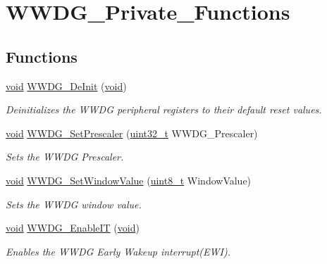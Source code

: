 \hypertarget{group___w_w_d_g___private___functions}{}\section{W\+W\+D\+G\+\_\+\+Private\+\_\+\+Functions}
\label{group___w_w_d_g___private___functions}
\subsection*{Functions}
\begin{DoxyCompactItemize}
\item 
\hyperlink{usb__devapi_8h_afabf60e7f57651d6d595a02c75f07cd0}{void} \hyperlink{group___w_w_d_g___private___functions_ga7130f4dc861b9234b62e73f9f57f89a1}{W\+W\+D\+G\+\_\+\+De\+Init} (\hyperlink{usb__devapi_8h_afabf60e7f57651d6d595a02c75f07cd0}{void})
\begin{DoxyCompactList}\small\item\em Deinitializes the W\+W\+DG peripheral registers to their default reset values. \end{DoxyCompactList}\item 
\hyperlink{usb__devapi_8h_afabf60e7f57651d6d595a02c75f07cd0}{void} \hyperlink{group___w_w_d_g___private___functions_gafeaa2b52c31ba7baca7eb61d2d42e07b}{W\+W\+D\+G\+\_\+\+Set\+Prescaler} (\hyperlink{_p_e___types_8h_a33594304e786b158f3fb30289278f5af}{uint32\+\_\+t} W\+W\+D\+G\+\_\+\+Prescaler)
\begin{DoxyCompactList}\small\item\em Sets the W\+W\+DG Prescaler. \end{DoxyCompactList}\item 
\hyperlink{usb__devapi_8h_afabf60e7f57651d6d595a02c75f07cd0}{void} \hyperlink{group___w_w_d_g___private___functions_gaf44a7bf8bf6b11b41cd89ff521fdd5a5}{W\+W\+D\+G\+\_\+\+Set\+Window\+Value} (\hyperlink{_p_e___types_8h_aba7bc1797add20fe3efdf37ced1182c5}{uint8\+\_\+t} Window\+Value)
\begin{DoxyCompactList}\small\item\em Sets the W\+W\+DG window value. \end{DoxyCompactList}\item 
\hyperlink{usb__devapi_8h_afabf60e7f57651d6d595a02c75f07cd0}{void} \hyperlink{group___w_w_d_g___private___functions_gac8af66ea5254d3d78b60b9b7c7f29521}{W\+W\+D\+G\+\_\+\+Enable\+IT} (\hyperlink{usb__devapi_8h_afabf60e7f57651d6d595a02c75f07cd0}{void})
\begin{DoxyCompactList}\small\item\em Enables the W\+W\+DG Early Wakeup interrupt(\+E\+W\+I). \end{DoxyCompactList}\item 

\end{DoxyCompactItemize}
